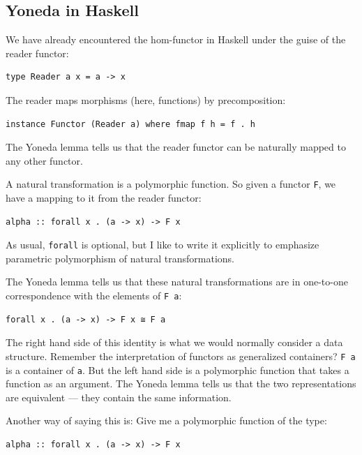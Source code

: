 \subsection{Yoneda in Haskell}\label{yoneda-in-haskell}

We have already encountered the hom-functor in Haskell under the guise
of the reader functor:

\begin{verbatim}
type Reader a x = a -> x
\end{verbatim}

The reader maps morphisms (here, functions) by precomposition:

\begin{verbatim}
instance Functor (Reader a) where fmap f h = f . h
\end{verbatim}

The Yoneda lemma tells us that the reader functor can be naturally
mapped to any other functor.

A natural transformation is a polymorphic function. So given a functor
\texttt{F}, we have a mapping to it from the reader functor:

\begin{verbatim}
alpha :: forall x . (a -> x) -> F x
\end{verbatim}

As usual, \texttt{forall} is optional, but I like to write it explicitly
to emphasize parametric polymorphism of natural transformations.

The Yoneda lemma tells us that these natural transformations are in
one-to-one correspondence with the elements of \texttt{F\ a}:

\begin{verbatim}
forall x . (a -> x) -> F x ≅ F a
\end{verbatim}

The right hand side of this identity is what we would normally consider
a data structure. Remember the interpretation of functors as generalized
containers? \texttt{F\ a} is a container of \texttt{a}. But the left
hand side is a polymorphic function that takes a function as an
argument. The Yoneda lemma tells us that the two representations are
equivalent --- they contain the same information.

Another way of saying this is: Give me a polymorphic function of the
type:

\begin{verbatim}
alpha :: forall x . (a -> x) -> F x
\end{verbatim}

